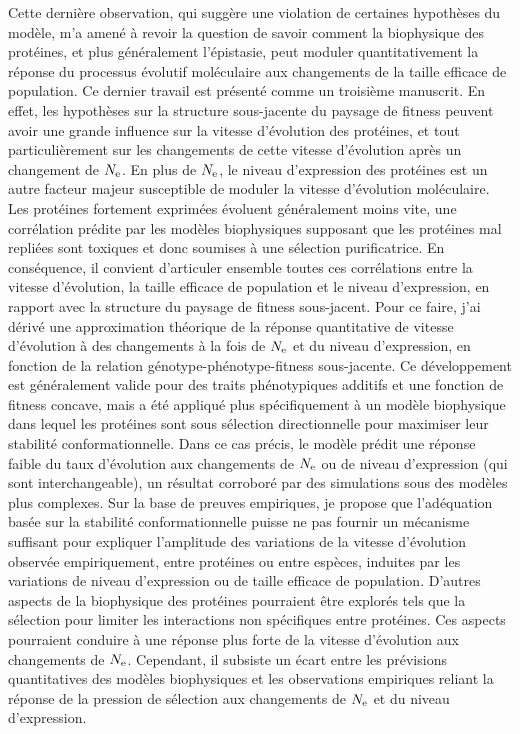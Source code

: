 Cette dernière observation, qui suggère une violation de certaines hypothèses du modèle, m'a amené à revoir la question de savoir comment la biophysique des protéines, et plus généralement l'épistasie, peut moduler quantitativement la réponse du processus évolutif moléculaire aux changements de la taille efficace de population.
Ce dernier travail est présenté comme un troisième manuscrit.
En effet, les hypothèses sur la structure sous-jacente du paysage de fitness peuvent avoir une grande influence sur la vitesse d'évolution des protéines, et tout particulièrement sur les changements de cette vitesse d'évolution après un changement de $N_{\textrm{e}}$.
En plus de $N_{\textrm{e}}$, le niveau d'expression des protéines est un autre facteur majeur susceptible de moduler la vitesse d'évolution moléculaire.
Les protéines fortement exprimées évoluent généralement moins vite, une corrélation prédite par les modèles biophysiques supposant que les protéines mal repliées sont toxiques et donc soumises à une sélection purificatrice.
En conséquence, il convient d'articuler ensemble toutes ces corrélations entre la vitesse d'évolution, la taille efficace de population et le niveau d'expression, en rapport avec la structure du paysage de fitness sous-jacent.
Pour ce faire, j'ai dérivé une approximation théorique de la réponse quantitative de vitesse d'évolution à des changements à la fois de $N_{\textrm{e}}$ et du niveau d'expression, en fonction de la relation génotype-phénotype-fitness sous-jacente.
Ce développement est généralement valide pour des traits phénotypiques additifs et une fonction de fitness concave, mais a été appliqué plus spécifiquement à un modèle biophysique dans lequel les protéines sont sous sélection directionnelle pour maximiser leur stabilité conformationnelle.
Dans ce cas précis, le modèle prédit une réponse faible du taux d'évolution aux changements de $N_{\textrm{e}}$ ou de niveau d'expression (qui sont interchangeable), un résultat corroboré par des simulations sous des modèles plus complexes.
Sur la base de preuves empiriques, je propose que l'adéquation basée sur la stabilité conformationnelle puisse ne pas fournir un mécanisme suffisant pour expliquer l'amplitude des variations de la vitesse d'évolution observée empiriquement, entre protéines ou entre espèces, induites par les variations de niveau d'expression ou de taille efficace de population.
D'autres aspects de la biophysique des protéines pourraient être explorés tels que la sélection pour limiter les interactions non spécifiques entre protéines.
Ces aspects pourraient conduire à une réponse plus forte de la vitesse d'évolution aux changements de $N_{\textrm{e}}$.
Cependant, il subsiste un écart entre les prévisions quantitatives des modèles biophysiques et les observations empiriques reliant la réponse de la pression de sélection aux changements de $N_{\textrm{e}}$ et du niveau d'expression.

